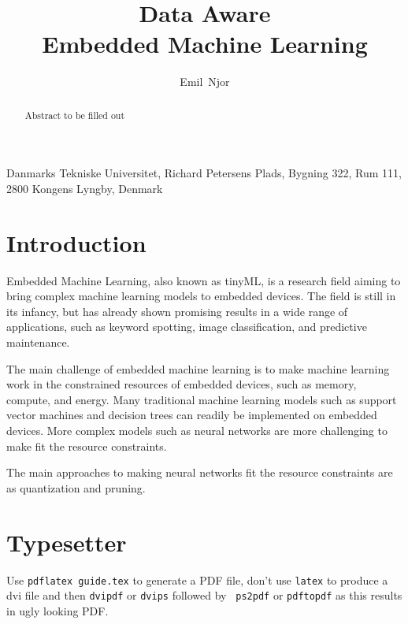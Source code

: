 \documentclass{acaces}
\begin{document}
\title{Data Aware\\Embedded Machine Learning
}

\author{
    Emil~Njor
}

\address{1}{
    Danmarks Tekniske Universitet,
    Richard Petersens Plads,
    Bygning 322,
    Rum 111,
    2800 Kongens Lyngby,
    Denmark
}


\pagestyle{empty}


\begin{abstract}
    Abstract to be filled out
    
\end{abstract}


\section{Introduction}
Embedded Machine Learning, also known as tinyML, is a research field aiming to bring complex machine learning models to embedded devices. 
The field is still in its infancy, but has already shown promising results in a wide range of applications, such as keyword spotting, image classification, and predictive maintenance.

The main challenge of embedded machine learning is to make machine learning work in the constrained resources of embedded devices, such as memory, compute, and energy.
Many traditional machine learning models such as support vector machines and decision trees can readily be implemented on embedded devices.
More complex models such as neural networks are more challenging to make fit the resource constraints.

The main approaches to making neural networks fit the resource constraints are as quantization and pruning.

\section{Typesetter}

Use {\tt pdflatex guide.tex} to generate a PDF file, don't use {\tt latex} to
produce a dvi file and then {\tt dvipdf} or {\tt dvips} followed by {\tt
        ps2pdf} or {\tt pdftopdf} as this results in ugly looking PDF.
\end{document}
